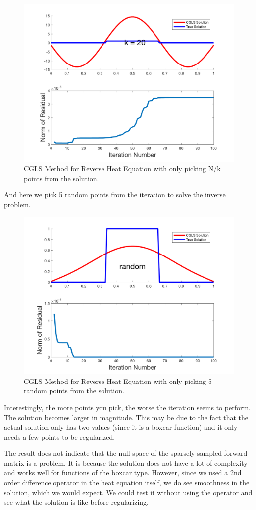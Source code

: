 \documentclass{article}
\begin{document}
\begin{figure}[H]
    \centerline{
    \includegraphics[height = 6 cm]{downsample_k20.png}
    }
    \caption{\label{fig:k20} CGLS Method for Reverse Heat Equation with only picking N/k points from the solution.}
\end{figure}

And here we pick 5 random points from the iteration to solve the inverse problem.

\begin{figure}[H]
    \centerline{
    \includegraphics[height = 6 cm]{downsample_random.png}
    }
    \caption{\label{fig:random} CGLS Method for Reverse Heat Equation with only picking 5 random points from the solution.}
\end{figure}

Interestingly, the more points you pick, the worse the iteration seems to perform. The solution becomes larger in magnitude. This may be due to the fact that the actual solution only has two values (since it is a boxcar function) and it only needs a few points to be regularized.

The result does not indicate that the null space of the sparsely sampled forward matrix is a problem. It is because the solution does not have a lot of complexity and works well for functions of the boxcar type. However, since we used a 2nd order difference operator in the heat equation itself, we do see smoothness in the solution, which we would expect. We could test it without using the operator and see what the solution is like before regularizing.
\end{document}

